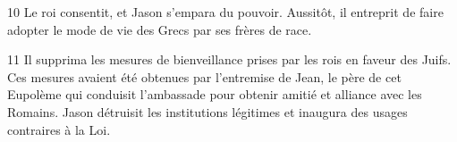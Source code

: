 
10 Le roi consentit, et Jason s’empara du pouvoir. Aussitôt, il entreprit de faire adopter le mode de vie des Grecs par ses frères de race.

11 Il supprima les mesures de bienveillance prises par les rois en faveur des Juifs. Ces mesures avaient été obtenues par l’entremise de Jean, le père de cet Eupolème qui conduisit l’ambassade pour obtenir amitié et alliance avec les Romains. Jason détruisit les institutions légitimes et inaugura des usages contraires à la Loi.
